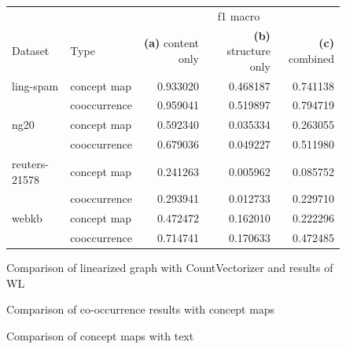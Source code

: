 \begin{figure}[ht]
\centering
\begin{tabular}{llrrr}
          & & \multicolumn{3}{c}{f1 macro} \\
Dataset & Type & \textbf{(a)} content only & \textbf{(b)} structure only & \textbf{(c)} combined\\
\midrule
ling-spam & concept map &  0.933020 &  0.468187 &  0.741138 \\
          & cooccurrence &  0.959041 &  0.519897 &  0.794719 \\
\midrule
ng20 & concept map &  0.592340 &  0.035334 &  0.263055 \\
          & cooccurrence &  0.679036 &  0.049227 &  0.511980 \\
\midrule
reuters-21578 & concept map &  0.241263 &  0.005962 &  0.085752 \\
          & cooccurrence &  0.293941 &  0.012733 &  0.229710 \\
\midrule
webkb & concept map &  0.472472 &  0.162010 &  0.222296 \\
          & cooccurrence &  0.714741 &  0.170633 &  0.472485 \\
\bottomrule
\end{tabular}
\caption{Comparison of linearized graph with CountVectorizer and results of WL}
\end{figure}

\begin{figure}[ht]
\centering
\missingfigure[figcolor=white]{}
\caption{Comparison of co-occurrence results with concept maps}
\end{figure}

\begin{figure}[ht]
\centering
\missingfigure[figcolor=white]{}
\caption{Comparison of concept maps with text}
\end{figure}



